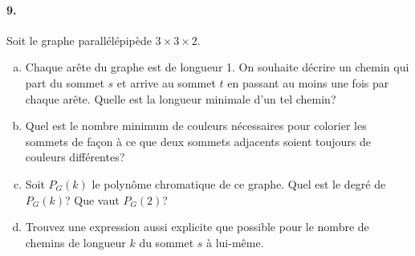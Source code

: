 \paragraph{9. } Soit le graphe parallélépipède $3 \times 3 \times 2$.

\begin{enumerate}[(a)]
  \item Chaque arête du graphe est de longueur 1. On souhaite décrire un chemin qui part du sommet $s$ et arrive au sommet $t$ en passant au moins une fois par chaque arête. Quelle est la longueur minimale d'un tel chemin?
  \item Quel est le nombre minimum de couleurs nécessaires pour colorier les sommets de façon à ce que deux sommets adjacents soient toujours de couleurs différentes?
  \item Soit $P_G(k)$ le polynôme chromatique de ce graphe. Quel est le degré de $P_G(k)$? Que vaut $P_G(2)$?
  \item Trouvez une expression aussi explicite que possible pour le nombre de chemins de longueur $k$ du sommet $s$ à lui-même.
\end{enumerate}

\begin{figure}[h!]
  \centering
\end{figure}

